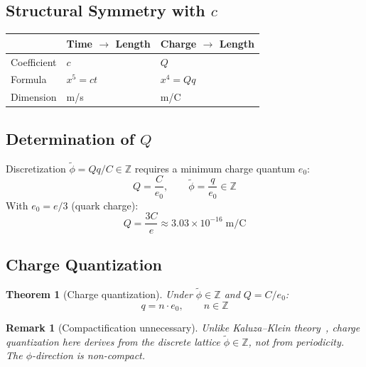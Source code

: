 \documentclass[12pt,a4paper]{article}
\newtheorem{theorem}{Theorem}[section]
\newtheorem*{remark}{Remark}
\begin{document}
\subsection{Structural Symmetry with $c$}

\begin{center}
\begin{tabular}{lll}
\toprule
 & Time $\to$ Length & Charge $\to$ Length \\
\midrule
Coefficient & $c$ & $Q$ \\
Formula & $x^5 = ct$ & $x^4 = Qq$ \\
Dimension & m/s & m/C \\
\bottomrule
\end{tabular}
\end{center}

\subsection{Determination of $Q$}

Discretization $\tilde{\phi} = Qq/C \in \mathbb{Z}$ requires a minimum charge quantum $e_0$:
\begin{equation}
Q = \frac{C}{e_0}, \qquad \tilde{\phi} = \frac{q}{e_0} \in \mathbb{Z} \tag{3.3}
\end{equation}
With $e_0 = e/3$ (quark charge):
\begin{equation}
Q = \frac{3C}{e} \approx 3.03 \times 10^{-16}\;\text{m/C} \tag{3.5}
\end{equation}

\subsection{Charge Quantization}

\begin{theorem}[Charge quantization]\label{thm:charge}
Under $\tilde{\phi} \in \mathbb{Z}$ and $Q = C/e_0$:
\begin{equation}
q = n \cdot e_0, \qquad n \in \mathbb{Z} \tag{3.7}
\end{equation}
\end{theorem}

\begin{remark}[Compactification unnecessary]
Unlike Kaluza--Klein theory~\cite{Kaluza1921,Klein1926}, charge quantization here derives from the discrete lattice $\tilde{\phi} \in \mathbb{Z}$, not from periodicity. The $\phi$-direction is non-compact.
\end{remark}
\end{document}
